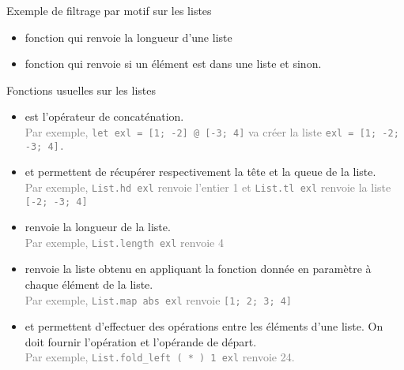 \documentclass[10pt]{beamer}
\begin{document}
\begin{frame}{\Ctitle}{\stitle}
	\begin{exampleblock}{Exemple de filtrage par motif sur les listes}
		\begin{itemize}
			\item<1-> fonction qui renvoie la longueur d'une liste
			\onslide<2->
			\item<3-> fonction qui renvoie  si un élément est dans une liste et  sinon.
			\onslide<4->
		\end{itemize}
	\end{exampleblock}
\end{frame}

\begin{frame}{\Ctitle}{\stitle}
	\begin{block}{Fonctions usuelles sur les listes}
		\begin{itemize}
			\item<1->  est l'opérateur de concaténation.\\
			\onslide<2->\textcolor{gray}{\small Par exemple, \texttt{let exl = [1; -2] @ [-3; 4]} va créer la liste \mbox{\tt exl = [1; -2; -3; 4].}}
			\item<3->  et  permettent de récupérer respectivement la tête et la queue de la liste.\\
			\onslide<4->\textcolor{gray}{\small Par exemple, \texttt{List.hd exl} renvoie l'entier 1 et \texttt{List.tl exl} renvoie la liste \mbox{\tt [-2; -3; 4]}}
			\item<5->  renvoie la longueur de la liste.\\
			\onslide<6->\textcolor{gray}{\small Par exemple, \texttt{List.length exl} renvoie 4}
			\item<7->  renvoie la liste obtenu en appliquant la fonction donnée en paramètre à chaque élément de la liste.\\
			\onslide<8->\textcolor{gray}{\small Par exemple, \texttt{List.map abs exl} renvoie \mbox{\tt [1; 2; 3; 4]}}
			\item<9->  et  permettent d'effectuer des opérations entre les éléments d'une liste. On doit fournir l'opération et l'opérande de départ.\\
			\onslide<10->\textcolor{gray}{\small Par exemple, \texttt{List.fold_left ( * ) 1 exl} renvoie 24.} 
		\end{itemize}
	\end{block}
\end{frame}
\end{document}
